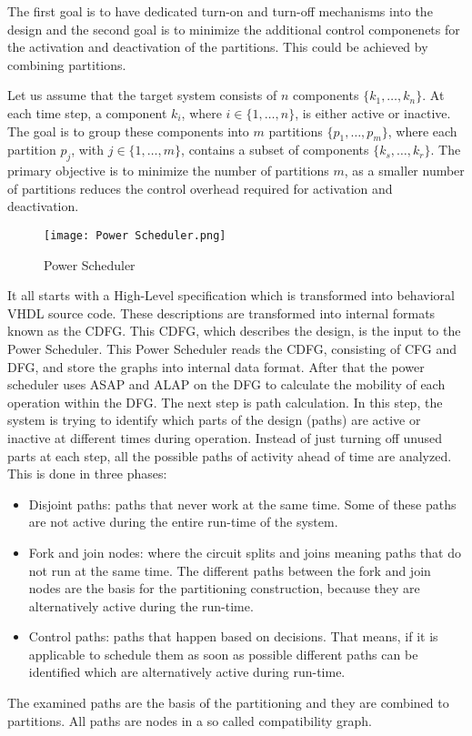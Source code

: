 \documentclass[conference]{IEEEtran}
\begin{document}
The first goal is to have dedicated turn-on and turn-off mechanisms into the design and the second goal is to minimize the additional control componenets for the activation and deactivation of the partitions. This could be achieved by combining partitions. 

Let us assume that the target system consists of $n$ components $\{k_1, \ldots, k_n\}$. At each time step, a component $k_i$, where $i \in \{1, \ldots, n\}$, is either active or inactive. The goal is to group these components into $m$ partitions $\{p_1, \ldots, p_m\}$, where each partition $p_j$, with $j \in \{1, \ldots, m\}$, contains a subset of components $\{k_s, \ldots, k_r\}$. The primary objective is to minimize the number of partitions $m$, as a smaller number of partitions reduces the control overhead required for activation and deactivation.

\begin{figure}
    \centering
    \texttt{[image: Power Scheduler.png]}
    \caption{Power Scheduler}
    \label{fig:power scheduler}
\end{figure}

It all starts with a High-Level specification which is transformed into behavioral VHDL source code. These descriptions are transformed into internal formats known as the CDFG. This CDFG, which describes the design, is the input to the Power Scheduler. This Power Scheduler reads the CDFG, consisting of CFG and DFG, and store the graphs into internal data format. After that the power scheduler uses ASAP and ALAP on the DFG to calculate the mobility of each operation within the DFG. The next step is path calculation. In this step, the system is trying to identify which parts of the design (paths) are active or inactive at different times during operation. Instead of just turning off unused parts at each step, all the possible paths of activity ahead of time are analyzed. This is done in three phases:
\begin{itemize}
    \item Disjoint paths: paths that never work at the same time. Some of these paths are not active during the entire run-time of the system.
    \item Fork and join nodes: where the circuit splits and joins meaning paths that do not run at the same time. The different paths between the fork and join nodes are the basis for the partitioning construction, because they are alternatively active during the run-time.
    \item Control paths: paths that happen based on decisions. That means, if it is applicable to schedule them as soon as possible different paths can be identified which are alternatively active during run-time.
\end{itemize}
The examined paths are the basis of the partitioning and they are combined to partitions. All paths are nodes in a so called compatibility graph. 
\end{document}
